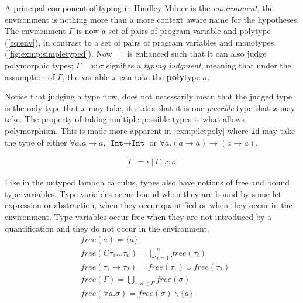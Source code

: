 A principal component of typing in Hindley-Milner is the \textit{environment}, the environment is nothing more than a more context aware name for the hypotheses.
The environment $\Gamma$ is now a set of pairs of program variable and polytype (\autoref{eq:env}), in contrast to a set of pairs of program variables and monotypes (\autoref{fig:exmp:simpletyped}).
Now $\vdash$ is enhanced such that it can also judge polymorphic types; $\Gamma \vdash x: \sigma$ signifies a \textit{typing judgment}, meaning that under the assumption of $\Gamma$, the variable $x$ can take the \textbf{poly}type $\sigma$.
\begin{remark}
    \label{remark:judgpoly}
    Notice that judging a type now, does not necessarily mean that the judged type is the only type that $x$ may take, it states that it is one \textit{possible} type that $x$ may take.
    The property of taking multiple possible types is what allows polymorphism.
    This is made more apparent in \autoref{exmp:letpoly} where \texttt{id} may take the type of either $\forall a . a \rightarrow a$, $\texttt{Int} \rightarrow \texttt{Int}$ or $\forall a . (a \rightarrow a) \rightarrow (a \rightarrow a)$.
\end{remark}
\begin{align}
	\Gamma \,\, = \epsilon \,|\, \Gamma, x : \sigma
	\label{eq:env}
\end{align}

Like in the untyped lambda calculus, types also have notions of free and bound type variables.
Type variables occur bound when they are bound by some let expression or abstraction, when they occur quantified or when they occur in the environment.
Type variables occur free when they are not introduced by a quantification and they do not occur in the environment.
\begin{align}
	 & \textit{free}(a) = \{ a \}                                                              \tag*{}\\
	 & \textit{free}(C \tau_1 \dots \tau_n ) = \bigcup_{i = 1}^n \textit{free}(\tau_i)           \tag*{}\\
     & \textit{free}(\tau_1 \rightarrow \tau_2) = \textit{free}(\tau_1) \cup \textit{free}(\tau_2)  \tag*{}        \\
	 & \textit{free}(\Gamma) = \bigcup_{x:\sigma \in \Gamma} \textit{free}(\sigma)             \tag*{}\\
   & \textit{free}(\forall a . \sigma) = \textit{free}(\sigma) \backslash \{ a \}                     \tag*{}
\end{align}

